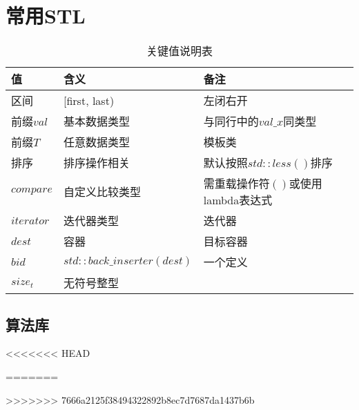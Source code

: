 \section{常用STL}

\begin{table}[htbp]
  \centering
  \caption{关键值说明表}
  \begin{tabularx}{\textwidth}{>{\raggedright\arraybackslash}X >{\centering\arraybackslash}X >{\raggedleft\arraybackslash}X}
    \toprule
    \rowcolor{headerbg}
    \textbf{值} & \textbf{含义} & \textbf{备注} \\
    \midrule
    区间 & [first, last) & 左闭右开 \\
    前缀$val$ & 基本数据类型 & 与同行中的$val\_x$同类型 \\
    前缀$T$ & 任意数据类型 & 模板类 \\
    排序 & 排序操作相关 & 默认按照$std::less()$排序 \\
    $compare$ & 自定义比较类型 & 需重载操作符$()$或使用lambda表达式 \\
    $iterator$ & 迭代器类型 & 迭代器 \\
    $dest$ & 容器 & 目标容器 \\
    $bid$ & $std::back\_inserter(dest)$ & 一个定义 \\
    $size_t$ & 无符号整型 & \\
    \bottomrule
  \end{tabularx}
\end{table}

\subsection{算法库}
<<<<<<< HEAD

=======



>>>>>>> 7666a2125f38494322892b8ec7d7687da1437b6b





















